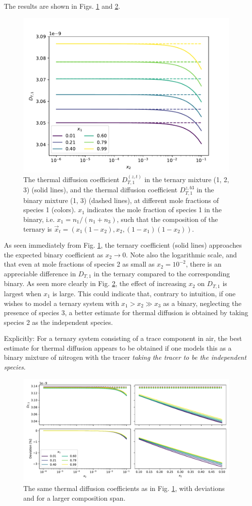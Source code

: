 The results are shown in Figs. \ref{fig:ternary_DT} and \ref{fig:ternary_DT_large}.

\begin{figure}[htb]
    \centering
    \includegraphics[width=.6\textwidth]{ternary_DT.pdf}
    \caption{The thermal diffusion coefficient $D_{T,1}^{(z, t)}$ in the ternary mixture (1, 2, 3) (solid lines), and the thermal diffusion coefficient $D_{T,1}^{z, b3}$ in the binary mixture (1, 3) (dashed lines), at different mole fractions of species 1 (colors). $x_1$ indicates the mole fraction of species 1 in the binary, i.e. $x_1 = n_1 / (n_1 + n_3)$, such that the composition of the ternary is $\Vec{x}_t = (x_1(1 - x_2), x_2, (1 - x_1)(1 - x_2))$.}
    \label{fig:ternary_DT}
\end{figure}

As seen immediately from Fig. \ref{fig:ternary_DT}, the ternary coefficient (solid lines) approaches the expected binary coefficient as $x_2 \to 0$. Note also the logarithmic scale, and that even at mole fractions of species 2 as small as $x_2 = 10^{-2}$, there is an appreciable difference in $D_{T,1}$ in the ternary compared to the corresponding binary. As seen more clearly in Fig. \ref{fig:ternary_DT_large}, the effect of increasing $x_2$ on $D_{T,1}$ is largest when $x_1$ is large. This could indicate that, contrary to intuition, if one wishes to model a ternary system with $x_1 > x_2 \gg x_3$ as a binary, neglecting the presence of species 3, a better estimate for thermal diffusion is obtained by taking species 2 as the independent species.

Explicitly: For a ternary system consisting of a trace component in air, the best estimate for thermal diffusion appears to be obtained if one models this as a binary mixture of nitrogen with the tracer \textit{taking the tracer to be the independent species}.

\begin{figure}[htb]
    \centering
    \includegraphics[width=.85\textwidth]{ternary_DT_large.pdf}
    \caption{The same thermal diffusion coefficients as in Fig. \ref{fig:ternary_DT}, with deviations and for a larger composition span.}
    \label{fig:ternary_DT_large}
\end{figure}
